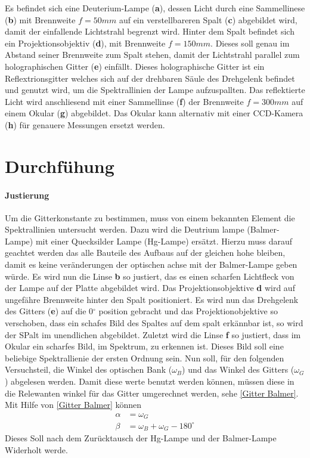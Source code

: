Es befindet sich eine Deuterium-Lampe (\textbf{a}), dessen Licht durch eine Sammellinese (\textbf{b}) mit Brennweite $f = 50mm$ auf ein verstellbareren Spalt (\textbf{c}) abgebildet wird, damit der einfallende Lichtstrahl begrenzt wird. 
Hinter dem Spalt befindet sich ein Projektionsobjektiv (\textbf{d}), mit Brennweite $f = 150mm$. 
Dieses soll genau im Abstand seiner Brennweite zum Spalt stehen, damit der Lichtstrahl parallel zum holographischen Gitter (\textbf{e}) einfällt. 
Dieses holographische Gitter ist ein Reflextrionsgitter welches sich auf der drehbaren Säule des Drehgelenk befindet und genutzt wird, um die Spektrallinien der Lampe aufzuspallten. 
Das reflektierte Licht wird anschliesend mit einer Sammellinse (\textbf{f}) der Brennweite $f=300mm$ auf einem Okular (\textbf{g}) abgebildet.
Das Okular kann alternativ mit einer CCD-Kamera (\textbf{h}) für genauere Messungen ersetzt werden.

\section{Durchfühung}

\paragraph{Justierung}

Um die Gitterkonstante zu bestimmen, muss von einem bekannten Element die Spektrallinien untersucht werden. 
Dazu wird die Deutrium lampe (Balmer-Lampe) mit einer Quecksilder Lampe (Hg-Lampe) ersätzt. 
Hierzu muss darauf geachtet werden das alle Bauteile des Aufbaus auf der gleichen hohe bleiben, damit es keine veränderungen der optischen achse mit der Balmer-Lampe geben würde.
Es wird nun die Linse \textbf{b} so justiert, das es einen scharfen Lichtfleck von der Lampe auf der Platte abgebildet wird.
Das Projektionsobjektive \textbf{d} wird auf ungefähre Brennweite hinter den Spalt positioniert. 
Es wird nun das Drehgelenk des Gitters (\textbf{e}) auf die 0$^\circ$ position gebracht und das Projektionobjektive so verschoben, dass ein schafes Bild des Spaltes auf dem spalt erkännbar ist, so wird der SPalt im unendlichen abgebildet.
Zuletzt wird die Linse \textbf{f} so justiert, dass im Okular ein scharfes Bild, im Spektrum, zu erkennen ist. Dieses Bild soll eine beliebige Spektrallienie der ersten Ordnung sein.
Nun soll, für den folgenden Versuchsteil, die Winkel des optischen Bank ($\omega_B$) und das Winkel des Gitters ($\omega_G$) abgelesen werden.  
Damit diese werte benutzt werden können, müssen diese in die Relewanten winkel für das Gitter umgerechnet werden, sehe \cref{Gitter Balmer}. 
Mit Hilfe von \cref{Gitter Balmer} können 
\begin{align}
    \alpha &= \omega_G \\  \beta &= \omega_B + \omega_G - 180^\circ 
\end{align}
Dieses Soll nach dem Zurücktausch der Hg-Lampe und der Balmer-Lampe Widerholt werde. 


